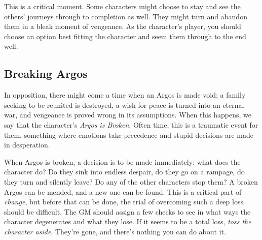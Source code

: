\documentclass[../main.tex]{subfiles}
\begin{document}
        This is a critical moment. Some characters might choose to stay and see the others' journeys through to completion as well. They might turn and abandon them in a bleak moment of vengeance. As the character's player, you should choose an option best fitting the character and seem them through to the end well.

    \subsection{Breaking Argos}

        In opposition, there might come a time when an Argos is made void; a family seeking to be reunited is destroyed, a wish for peace is turned into an eternal war, and vengeance is proved wrong in its assumptions. When this happens, we say that the character's \emph{Argos is Broken}. Often time, this is a traumatic event for them, something where emotions take precedence and stupid decisions are made in desperation.

        When Argos is broken, a decision is to be made immediately: what does the character do? Do they sink into endless despair, do they go on a rampage, do they turn and silently leave? Do any of the other characters stop them? A broken Argos can be mended, and a new one can be found. This is a critical part of \emph{change}, but before that can be done, the trial of overcoming such a deep loss should be difficult. The GM should assign a few checks to see in what ways the character degenerates and what they lose. If it seems to be a total loss, \emph{toss the character aside}. They're gone, and there's nothing you can do about it.
\end{document}
